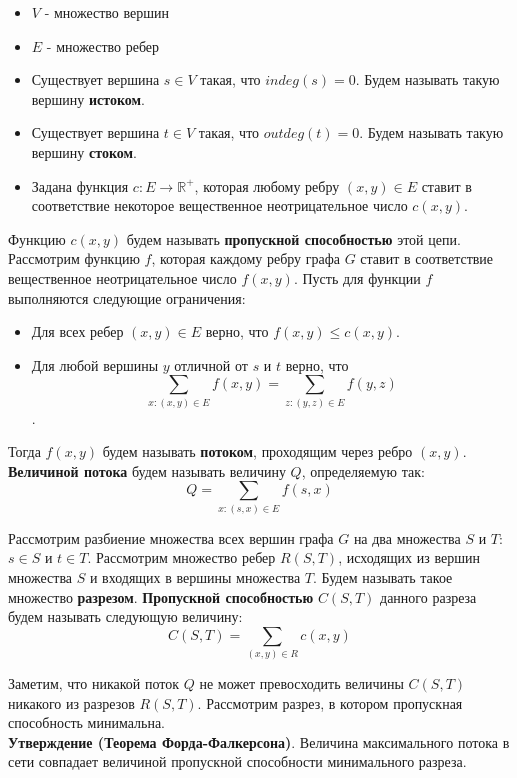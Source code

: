 \documentclass{article}
\begin{document}
\begin{itemize}
	\item $V$ - множество вершин
	\item $E$ - множество ребер
	\item Существует вершина $s \in V$ такая, что $indeg(s) = 0$. Будем называть такую вершину \textbf{истоком}.
	\item Существует вершина $t \in V$ такая, что $outdeg(t) = 0$. Будем называть такую вершину \textbf{стоком}.
	\item Задана функция $c: E \to \mathbb{R^+}$, которая любому ребру $(x, y) \in E$ ставит в соответствие некоторое вещественное неотрицательное число $c(x, y)$. 
\end{itemize}

Функцию $c(x, y)$ будем называть \textbf{пропускной способностью} этой цепи. \\

Рассмотрим функцию $f$, которая каждому ребру графа $G$ ставит в соответствие вещественное неотрицательное число $f(x, y)$. Пусть для функции $f$ выполняются следующие ограничения:

\begin{itemize}
	\item Для всех ребер $(x, y) \in E$ верно, что $f(x, y) \le c(x, y)$.
	\item Для любой вершины $y$ отличной от $s$ и $t$ верно, что $$\sum_{x : (x, y) \in E} f(x, y) = \sum_{z : (y, z) \in E} f(y, z)$$.
\end{itemize}  

Тогда $f(x, y)$ будем называть \textbf{потоком}, проходящим через ребро $(x, y)$. \textbf{Величиной потока} будем называть величину $Q$, определяемую так: $$Q = \sum_{x: (s, x) \in E} f(s, x) $$

Рассмотрим разбиение множества всех вершин графа $G$ на два множества $S$ и $T$: $s \in S$ и $t \in T$. Рассмотрим множество ребер $R(S, T)$, исходящих из вершин множества $S$ и входящих в вершины множества $T$. Будем называть такое множество \textbf{разрезом}. \textbf{Пропускной способностью} $C(S, T)$ данного разреза будем называть следующую величину: $$ C(S, T) = \sum_{(x, y) \in R} c(x, y) $$

Заметим, что никакой поток $Q$ не может превосходить величины $C(S, T)$ никакого из разрезов $R(S, T)$. Рассмотрим разрез, в котором пропускная способность минимальна. \\

\textbf{Утверждение (Теорема Форда-Фалкерсона)}. Величина максимального потока в сети совпадает величиной пропускной способности минимального разреза.
\end{document}
